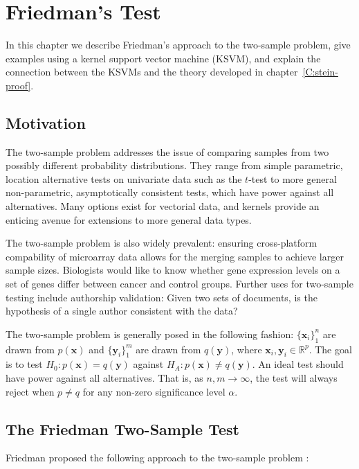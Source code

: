 \graphicspath{{./NIPS/img/}}
\chapter{Friedman's Test}
\label{C:friedman-test}
In this chapter we describe Friedman's approach to the two-sample
problem, give examples using a kernel support vector machine (KSVM), and
explain the connection between the KSVMs and the theory developed in
chapter~\ref{C:stein-proof}.

\section{Motivation}
The two-sample problem addresses the issue of comparing samples from
two possibly different probability distributions.  They range from
simple parametric, location alternative tests on univariate data such as the
$t$-test to more general non-parametric, asymptotically consistent tests, which
have power against all alternatives.  Many options exist for vectorial
data, and kernels provide an enticing avenue for extensions to more
general data types.  

The two-sample problem is also widely prevalent: ensuring
cross-platform compability of microarray data allows for the merging
samples to achieve larger sample sizes.  Biologists would like to know
whether gene expression levels on a set of genes differ between cancer
and control groups.  Further uses for two-sample testing include
authorship validation: Given two sets of documents, is the hypothesis
of a single author consistent with the data?

The two-sample problem is generally posed in the following fashion: $\{
\mathbf{x}_i\}_1^n$ are drawn from $p(\mathbf{x})$ and
$\{\mathbf{y}_i\}_1^m$ are drawn from $q(\mathbf{y})$, where $\mathbf{x}_i,
\mathbf{y}_i \in \mathbb{R}^p$. The goal is to test $H_0:
p(\mathbf{x}) = q(\mathbf{y})$ against $H_A: p(\mathbf{x}) \neq
q(\mathbf{y})$. An ideal test should have power against all
alternatives. That is, as $n,m \to \infty$, the test
will always reject when $p \neq q$ for any non-zero significance level
$\alpha$. 

\section{The Friedman Two-Sample Test}
Friedman proposed the following approach to the two-sample problem
\cite{friedman30908multivariate}:

